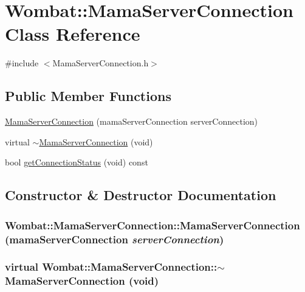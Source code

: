 \hypertarget{classWombat_1_1MamaServerConnection}{
\section{Wombat::MamaServerConnection Class Reference}
\label{classWombat_1_1MamaServerConnection}
}


{\ttfamily \#include $<$MamaServerConnection.h$>$}\subsection*{Public Member Functions}
\begin{DoxyCompactItemize}
\item 
\hyperlink{classWombat_1_1MamaServerConnection_a5c1f68cc0d8980bc279db6200a1addbc}{MamaServerConnection} (mamaServerConnection serverConnection)
\item 
virtual \hyperlink{classWombat_1_1MamaServerConnection_a6860fe2dd8d81846f6123bdf0acb20b8}{$\sim$MamaServerConnection} (void)
\item 
bool \hyperlink{classWombat_1_1MamaServerConnection_a4e7aae644962cb04257a51ce0f5b9b3b}{getConnectionStatus} (void) const 
\end{DoxyCompactItemize}


\subsection{Constructor \& Destructor Documentation}
\hypertarget{classWombat_1_1MamaServerConnection_a5c1f68cc0d8980bc279db6200a1addbc}{
\subsubsection[{MamaServerConnection}]{\setlength{\rightskip}{0pt plus 5cm}Wombat::MamaServerConnection::MamaServerConnection (mamaServerConnection {\em serverConnection})}}
\label{classWombat_1_1MamaServerConnection_a5c1f68cc0d8980bc279db6200a1addbc}
\hypertarget{classWombat_1_1MamaServerConnection_a6860fe2dd8d81846f6123bdf0acb20b8}{
\subsubsection[{$\sim$MamaServerConnection}]{\setlength{\rightskip}{0pt plus 5cm}virtual Wombat::MamaServerConnection::$\sim$MamaServerConnection (void)}}
\label{classWombat_1_1MamaServerConnection_a6860fe2dd8d81846f6123bdf0acb20b8}


